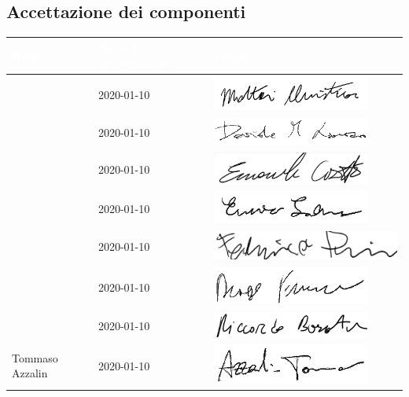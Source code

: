 \subsection{Accettazione dei componenti}
{
	\renewcommand{\arraystretch}{2}
	\begin{longtable}{ C{5cm} C{4cm} C{5cm} }
		\textcolor{white}{\textbf{Nome}} & \textcolor{white}{\textbf{Data di Accettazione}} & \textcolor{white}{\textbf{Firma}}\\	\endhead
		
		
		\MC & 2020-01-10 & \includegraphics[scale=0.70]{sezioni/Firme/Christian.png}\\
		\LD & 2020-01-10 & \includegraphics[scale=0.60]{sezioni/Firme/Davide.png}\\
		\CE & 2020-01-10 & \includegraphics[scale=0.70]{sezioni/Firme/Emanuele.png} \\
		\SE & 2020-01-10 & \includegraphics[scale=0.70]{sezioni/Firme/Enrico.png}\\
		\PF & 2020-01-10 & \includegraphics[scale=0.50]{sezioni/Firme/Federico.png}\\
		\DF & 2020-01-10 & \includegraphics[scale=0.70]{sezioni/Firme/Francesco.png} \\
		\BR & 2020-01-10& \includegraphics[scale=0.70]{sezioni/Firme/Riccardo.png} \\
		Tommaso Azzalin & 2020-01-10 & \includegraphics[scale=0.70]{sezioni/Firme/Tommaso.png} \\
		
		
	\end{longtable}
}

